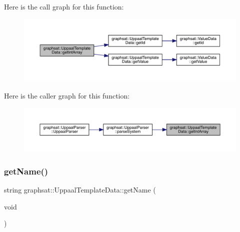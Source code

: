 Here is the call graph for this function\+:
\nopagebreak
\begin{figure}[H]
\begin{center}
\leavevmode
\includegraphics[width=350pt]{classgraphsat_1_1_uppaal_template_data_a46c3566202741551f2eb16f82282bbbb_cgraph}
\end{center}
\end{figure}
Here is the caller graph for this function\+:
\nopagebreak
\begin{figure}[H]
\begin{center}
\leavevmode
\includegraphics[width=350pt]{classgraphsat_1_1_uppaal_template_data_a46c3566202741551f2eb16f82282bbbb_icgraph}
\end{center}
\end{figure}
\mbox{\label{classgraphsat_1_1_uppaal_template_data_ad84fdea3fae1df16f8348e91a08377c0}} 
\subsubsection{\texorpdfstring{getName()}{getName()}}
{\footnotesize\ttfamily string graphsat\+::\+Uppaal\+Template\+Data\+::get\+Name (\begin{DoxyParamCaption}\item[{void}]{ }\end{DoxyParamCaption})\hspace{0.3cm}{\ttfamily [inline]}}

\mbox{\label{classgraphsat_1_1_uppaal_template_data_ae03ac08e2fac3516a81cc86bfae9b921}} 
